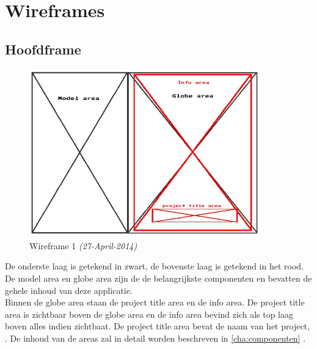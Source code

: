 \chapter{Wireframes} \label{cha:wireframes}

\section{Hoofdframe} \label{sec:hoofdframe}
\begin{figure}[h]
  \includegraphics[width=100mm]{figs/wireframe1.jpg}
  \caption{Wireframe 1 \textit{(27-April-2014)}}
  \label{fig:wireframe1}
\end{figure}

De onderste laag is getekend in zwart, de bovenste laag is getekend in het rood.\\
De model area en globe area zijn de de belangrijkste componenten en bevatten de gehele inhoud van deze applicatie.\\
Binnen de globe area staan de project title area en de info area. De project title area is zichtbaar boven de globe area en de info area bevind zich als top laag boven alles indien zichtbaat. De project title area bevat de naam van het project, \projectname.
De inhoud van de areas zal in detail worden beschreven in \cref{cha:componenten} .
\newpage
